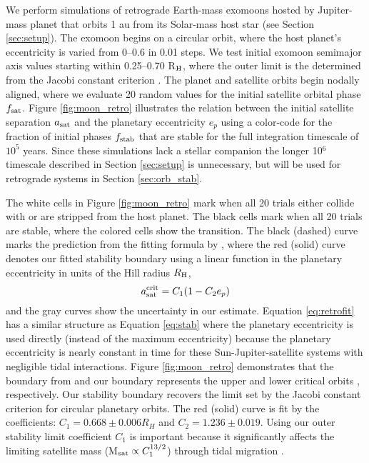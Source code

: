 \documentclass[preprint]{aastex63}
\begin{document}
We perform simulations of retrograde {Earth-mass} exomoons hosted by Jupiter-mass planet that orbits 1 au from its Solar-mass host star (see Section \ref{sec:setup}).  The exomoon begins on a circular orbit, where the host planet's eccentricity is varied from 0--0.6 in 0.01 steps.  We test initial exomoon semimajor axis values starting within 0.25--0.70 R$_{\rm H}$, where the outer limit is the determined from the Jacobi constant criterion \citep{Eberle2008,Quarles2020}.  The planet and satellite orbits begin nodally aligned, where we evaluate 20 random values for the initial satellite orbital phase $f_{\rm sat}$.  Figure \ref{fig:moon_retro} illustrates the relation between the initial satellite separation $a_{\rm sat}$ and the planetary eccentricity $e_p$ using a color-code for the fraction of initial phases $f_{\rm stab}$ that are stable for the full integration timescale of $10^5$ years.  {Since these simulations lack a stellar companion the longer 10$^6$ timescale described in Section \ref{sec:setup} is unnecessary, but will be used for retrograde systems in Section \ref{sec:orb_stab}.}

The white cells in Figure \ref{fig:moon_retro} mark when all 20 trials either collide with or are stripped from the host planet.  The black cells mark when all 20 trials are stable, where the colored cells show the transition.  The black (dashed) curve marks the prediction from the fitting formula by \cite{Domingos2006}, where the red (solid) curve denotes our fitted stability boundary using a linear function in the planetary eccentricity in units of the Hill radius $R_{\rm H}$, 
\begin{equation}
    a_{\rm sat}^{\rm crit} = C_1(1-C_2e_p)\label{eq:retrofit}
\end{equation}
and the gray curves show the uncertainty in our estimate. Equation \ref{eq:retrofit} has a similar structure as Equation \ref{eq:stab} where the planetary eccentricity is used directly (instead of the maximum eccentricity) because the planetary eccentricity is nearly constant in time for these Sun-Jupiter-satellite systems with negligible tidal interactions.  Figure \ref{fig:moon_retro} demonstrates that the boundary from \cite{Domingos2006} and our boundary represents the upper and lower critical orbits \citep{Dvorak1986}, respectively.  Our stability boundary recovers the limit set by the Jacobi constant criterion \citep{Eberle2008,Quarles2020} for circular planetary orbits.  The red (solid) curve is fit by the coefficients: $C_1 = 0.668 \pm 0.006 R_H$ and $C_2 = 1.236 \pm 0.019$.  Using our outer stability limit coefficient $C_1$ is important because it significantly affects the limiting satellite mass (M$_{\rm sat} \propto C_1^{13/2}$) through tidal migration \citep{Barnes2002}.
\end{document}
